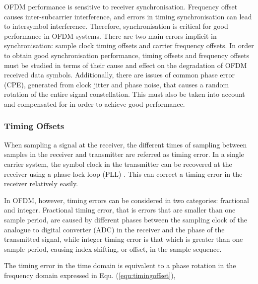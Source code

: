 OFDM performance is sensitive to receiver synchronisation.
Frequency offset causes inter-subcarrier interference, and errors in timing synchronisation can lead to intersymbol interference.
Therefore, synchronisation is critical for good performance in OFDM systems.
There are two main errors implicit in synchronisation: sample clock timing offsets and carrier frequency offsets.
In order to obtain good synchronisation performance, timing offsets and frequency offsets must be studied in terms of their cause and effect on the degradation of OFDM received data symbols.
Additionally, there are issues of common phase error (CPE), generated from clock jitter and phase noise, that causes a random rotation of the entire signal constellation.
This must also be taken into account and compensated for in order to achieve good performance.

\subsubsection{Timing Offsets}

When sampling a signal at the receiver, the different times of sampling between samples in the receiver and transmitter are referred as timing error.
In a single carrier system, the symbol clock in the transmitter can be recovered at the receiver using a phase-lock loop (PLL) \cite{farhang2008signal}.
This can correct a timing error in the receiver relatively easily.

In OFDM, however, timing errors can be considered in two categories: fractional and integer.
Fractional timing error, that is errors that are smaller than one sample period, are caused by different phases between the sampling clock of the analogue to digital converter (ADC) in the receiver and the phase of the transmitted signal, while integer timing error is that which is greater than one sample period, causing index shifting, or offset, in the sample sequence.

The timing error in the time domain is equivalent to a phase rotation in the frequency domain expressed in Equ. (\ref{equ:timingoffset}),

